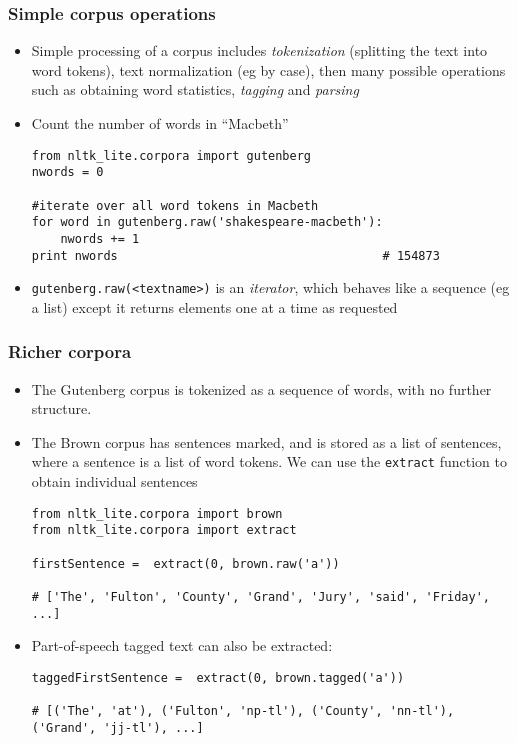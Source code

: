 \begin{frame}[fragile]
  \frametitle{Simple corpus operations}

  \begin{itemize}
  \item<1-> Simple processing of a corpus includes \emph{tokenization}
    (splitting the text into word tokens), text normalization (eg by
    case), then many possible operations such as obtaining word
    statistics, \emph{tagging} and \emph{parsing} 
  \item<2-> Count the number of words in ``Macbeth''
{\small
\begin{verbatim}
from nltk_lite.corpora import gutenberg
nwords = 0

#iterate over all word tokens in Macbeth
for word in gutenberg.raw('shakespeare-macbeth'): 
    nwords += 1
print nwords                                     # 154873
\end{verbatim}}
  \item <3-> \texttt{gutenberg.raw(<textname>)} is an
    \emph{iterator}, which behaves like a sequence (eg a list) except
    it returns elements one at a time as requested
  \end{itemize}
\end{frame}

\begin{frame}[fragile]
  \frametitle{Richer corpora}

  \begin{itemize}
  \item<1-> The Gutenberg corpus is tokenized as a sequence of words, with
    no further structure.  
  \item<2-> The Brown corpus has sentences marked, and is stored as a list
    of sentences, where a sentence is a list of word tokens.  We can
    use the \texttt{extract} function to obtain individual sentences
{\small
\begin{verbatim}
from nltk_lite.corpora import brown
from nltk_lite.corpora import extract

firstSentence =  extract(0, brown.raw('a'))

# ['The', 'Fulton', 'County', 'Grand', 'Jury', 'said', 'Friday', ...]
\end{verbatim}}
  \item<3-> Part-of-speech tagged text can also be extracted:
{\small
\begin{verbatim}
taggedFirstSentence =  extract(0, brown.tagged('a'))

# [('The', 'at'), ('Fulton', 'np-tl'), ('County', 'nn-tl'), ('Grand', 'jj-tl'), ...]
\end{verbatim}}
  \end{itemize}
\end{frame}

